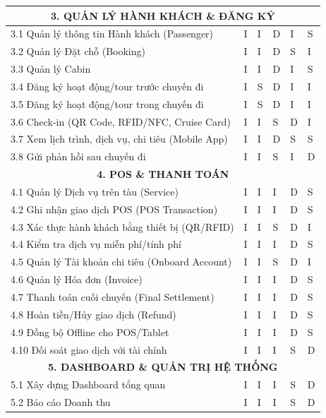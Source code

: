 \documentclass[a4paper,12pt]{article}
\begin{document}
\begin{longtable}{|p{5.5cm}|p{2.2cm}|p{2.2cm}|p{2.2cm}|p{2.2cm}|p{2.2cm}|}
		\hline
		\multicolumn{6}{|c|}{\textbf{3. QUẢN LÝ HÀNH KHÁCH \& ĐĂNG KÝ}} \\
		\hline
		3.1 Quản lý thông tin Hành khách (Passenger) & I & I & D & I & S \\
		\hline
		3.2 Quản lý Đặt chỗ (Booking) & I & I & D & S & I \\
		\hline
		3.3 Quản lý Cabin & I & I & D & I & S \\
		\hline
		3.4 Đăng ký hoạt động/tour trước chuyến đi & I & S & D & I & I \\
		\hline
		3.5 Đăng ký hoạt động/tour trong chuyến đi & I & S & D & I & I \\
		\hline
		3.6 Check-in (QR Code, RFID/NFC, Cruise Card) & I & I & S & D & I \\
		\hline
		3.7 Xem lịch trình, dịch vụ, chi tiêu (Mobile App) & I & I & D & S & S \\
		\hline
		3.8 Gửi phản hồi sau chuyến đi & I & I & S & I & D \\
		\hline
		\multicolumn{6}{|c|}{\textbf{4. POS \& THANH TOÁN}} \\
		\hline
		4.1 Quản lý Dịch vụ trên tàu (Service) & I & I & I & D & S \\
		\hline
		4.2 Ghi nhận giao dịch POS (POS Transaction) & I & I & I & D & S \\
		\hline
		4.3 Xác thực hành khách bằng thiết bị (QR/RFID) & I & I & S & D & I \\
		\hline
		4.4 Kiểm tra dịch vụ miễn phí/tính phí & I & I & I & D & S \\
		\hline
		4.5 Quản lý Tài khoản chi tiêu (Onboard Account) & I & I & S & D & I \\
		\hline
		4.6 Quản lý Hóa đơn (Invoice) & I & I & I & D & S \\
		\hline
		4.7 Thanh toán cuối chuyến (Final Settlement) & I & I & I & D & S \\
		\hline
		4.8 Hoàn tiền/Hủy giao dịch (Refund) & I & I & I & D & S \\
		\hline
		4.9 Đồng bộ Offline cho POS/Tablet & I & I & I & D & S \\
		\hline
		4.10 Đối soát giao dịch với tài chính & I & I & I & S & D \\
		\hline
		\multicolumn{6}{|c|}{\textbf{5. DASHBOARD \& QUẢN TRỊ HỆ THỐNG}} \\
		\hline
		5.1 Xây dựng Dashboard tổng quan & I & I & I & S & D \\
		\hline
		5.2 Báo cáo Doanh thu & I & I & I & S & D \\
		\hline

\end{longtable}
\end{document}

